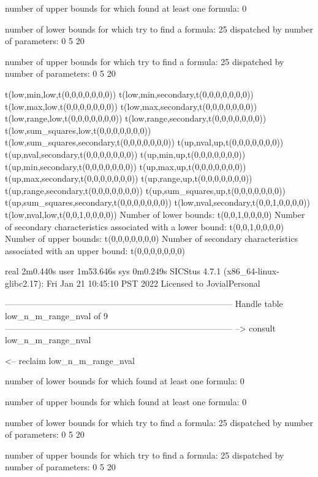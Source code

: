 number of upper bounds for which found at least one formula: 0

number of lower bounds for which try to find a formula: 25
dispatched by number of parameters: 0  5  20

number of upper bounds for which try to find a formula: 25
dispatched by number of parameters: 0  5  20

t(low,min,low,t(0,0,0,0,0,0,0))
t(low,min,secondary,t(0,0,0,0,0,0,0))
t(low,max,low,t(0,0,0,0,0,0,0))
t(low,max,secondary,t(0,0,0,0,0,0,0))
t(low,range,low,t(0,0,0,0,0,0,0))
t(low,range,secondary,t(0,0,0,0,0,0,0))
t(low,sum_squares,low,t(0,0,0,0,0,0,0))
t(low,sum_squares,secondary,t(0,0,0,0,0,0,0))
t(up,nval,up,t(0,0,0,0,0,0,0))
t(up,nval,secondary,t(0,0,0,0,0,0,0))
t(up,min,up,t(0,0,0,0,0,0,0))
t(up,min,secondary,t(0,0,0,0,0,0,0))
t(up,max,up,t(0,0,0,0,0,0,0))
t(up,max,secondary,t(0,0,0,0,0,0,0))
t(up,range,up,t(0,0,0,0,0,0,0))
t(up,range,secondary,t(0,0,0,0,0,0,0))
t(up,sum_squares,up,t(0,0,0,0,0,0,0))
t(up,sum_squares,secondary,t(0,0,0,0,0,0,0))
t(low,nval,secondary,t(0,0,1,0,0,0,0))
t(low,nval,low,t(0,0,1,0,0,0,0))
Number of lower bounds:                                             t(0,0,1,0,0,0,0)
Number of secondary characteristics associated with a lower bound:  t(0,0,1,0,0,0,0)
Number of upper bounds:                                             t(0,0,0,0,0,0,0)
Number of secondary characteristics associated with an upper bound: t(0,0,0,0,0,0,0)

real	2m0.440s
user	1m53.646s
sys	0m0.249s
SICStus 4.7.1 (x86_64-linux-glibc2.17): Fri Jan 21 10:45:10 PST 2022
Licensed to JovialPersonal


--------------------------------------------------------------------------------
Handle table low_n_m_range_nval of 9
--------------------------------------------------------------------------------
--> consult low_n_m_range_nval

<-- reclaim low_n_m_range_nval

number of lower bounds for which found at least one formula: 0

number of upper bounds for which found at least one formula: 0

number of lower bounds for which try to find a formula: 25
dispatched by number of parameters: 0  5  20

number of upper bounds for which try to find a formula: 25
dispatched by number of parameters: 0  5  20

